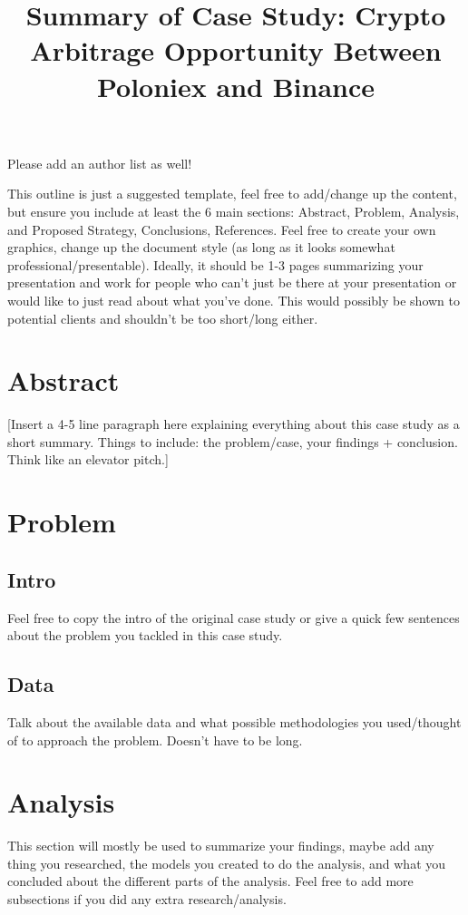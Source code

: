 \documentclass{article}
\begin{document}
\title{\textbf{Summary of Case Study: Crypto Arbitrage Opportunity Between Poloniex and Binance}}
\maketitle

Please add an author list as well!

This outline is just a suggested template, feel free to add/change up the content, but ensure you include at least the 6 main sections: Abstract, Problem, Analysis, and Proposed Strategy, Conclusions, References. Feel free to create your own graphics, change up the document style (as long as it looks somewhat professional/presentable). Ideally, it should be 1-3 pages summarizing your presentation and work for people who can't just be there at your presentation or would like to just read about what you've done. This would possibly be shown to potential clients and shouldn't be too short/long either.
\section{Abstract}
[Insert a 4-5 line paragraph here explaining everything about this case study as a short summary. Things to include: the problem/case, your findings + conclusion. Think like an elevator pitch.]

\section{Problem}
\subsection{Intro}
Feel free to copy the intro of the original case study or give a quick few sentences about the problem you tackled in this case study.
\subsection{Data}
Talk about the available data and what possible methodologies you used/thought of to approach the problem. Doesn't have to be long.

\section{Analysis}
This section will mostly be used to summarize your findings, maybe add any thing you researched, the models you created to do the analysis, and what you concluded about the different parts of the analysis. Feel free to add more subsections if you did any extra research/analysis.
\end{document}
